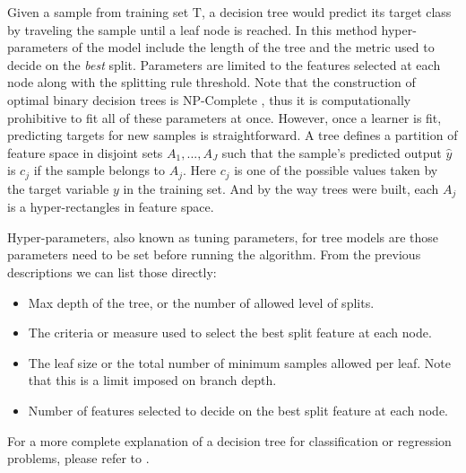 \smallskip


Given a sample from training set $\mathrm{T}$, a decision tree would predict its target class by traveling the sample until a leaf node is reached. In this method hyper-parameters of the model include the length of the tree and the metric used to decide on the \textit{best} split. Parameters are limited to the features selected at each node along with the splitting rule threshold. Note that the construction of optimal binary decision trees is NP-Complete \cite{decisionTreesNP}, thus it is computationally prohibitive to fit all of these parameters at once. However, once a learner is fit, predicting targets for new samples is straightforward. A tree defines a partition of feature space in disjoint sets $A_1,...,A_J$ such that the sample's predicted output $\hat{y}$ is $c_j$ if the sample belongs to $A_j$. Here $c_j$ is one of the possible values taken by the target variable $y$ in the training set. And by the way trees were built, each $A_j$ is a hyper-rectangles in feature space.


Hyper-parameters, also known as tuning parameters, for tree models are those parameters need to be set before running the algorithm. From the previous descriptions we can list those directly:

\begin{itemize}
	\item Max depth of the tree, or the number of allowed level of splits.
	\item The criteria or measure used to select the best split feature at each node.
	\item The leaf size or the total number of minimum samples allowed per leaf. Note that this is a limit imposed on  branch depth. 
	\item Number of features selected to decide on the best split feature at each node.
\end{itemize}



For a more complete explanation of a decision tree for classification or regression problems, please refer to \cite{breiman-cart84}.
